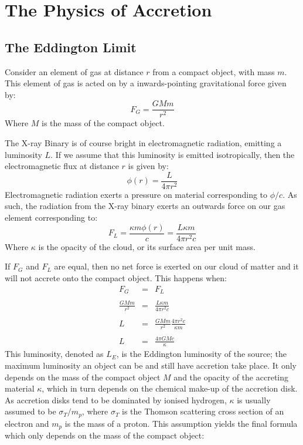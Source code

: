 \chapter{The Physics of Accretion}

\label{sec:PhysAcc}

\section{The Eddington Limit}

\par Consider an element of gas at distance $r$ from a compact object, with mass $m$.  This element of gas is acted on by a inwards-pointing gravitational force given by:
\begin{equation}
F_G=\frac{GMm}{r^2}
\end{equation}
Where $M$ is the mass of the compact object.
\par The X-ray Binary is of course bright in electromagnetic radiation, emitting a luminosity $L$.  If we assume that this luminosity is emitted isotropically, then the electromagnetic flux at distance $r$ is given by:
\begin{equation}
\phi(r)=\frac{L}{4\pi r^2}
\end{equation}
Electromagnetic radiation exerts a pressure on material corresponding to $\phi/c$.  As such, the radiation from the X-ray binary exerts an outwards force on our gas element corresponding to:
\begin{equation}
F_L=\frac{\kappa m\phi(r)}{c}=\frac{L\kappa m}{4\pi r^2c}
\end{equation}
Where $\kappa$ is the opacity of the cloud, or its surface area per unit mass.
\par If $F_G$ and $F_L$ are equal, then no net force is exerted on our cloud of matter and it will not accrete onto the compact object.  This happens when:
\begin{eqnarray}
F_G&=&F_L\\ \nonumber \\
\frac{GMm}{r^2}&=&\frac{L\kappa m}{4\pi r^2c} \\ \nonumber \\
L&=&\frac{GMm}{r^2}\frac{4\pi r^2c}{\kappa m} \\ \nonumber \\
L&=&\frac{4\pi GMc}{\kappa}
\end{eqnarray}
This luminosity, denoted as $L_E$, is the Eddington luminosity of the source; the maximum luminosity an object can be and still have accretion take place.  It only depends on the mass of the compact object $M$ and the opacity of the accreting material $\kappa$, which in turn depends on the chemical make-up of the accretion disk.  As accretion disks tend to be dominated by ionised hydrogen, $\kappa$ is usually assumed to be $\sigma_T/m_p$, where $\sigma_T$ is the Thomson scattering cross section of an electron and $m_p$ is the mass of a proton.  This assumption yields the final formula which only depends on the mass of the compact object:
